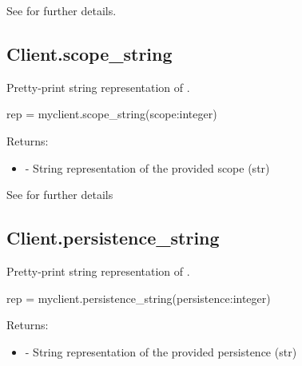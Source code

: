 See  for further details.


\subsection{Client.scope_string}

\summary

Pretty-print string representation of .

\format

\pyspecificstart
\begin{codepar}
rep = myclient.scope_string(scope:integer)
\end{codepar}
\pyspecificend

\begin{arglist}
\end{arglist}

Returns:
\begin{itemize}
    \item {} - String representation of the provided scope (str)
\end{itemize}

See  for further details


\subsection{Client.persistence_string}

\summary

Pretty-print string representation of .

\format

\pyspecificstart
\begin{codepar}
rep = myclient.persistence_string(persistence:integer)
\end{codepar}
\pyspecificend

\begin{arglist}
\end{arglist}

Returns:
\begin{itemize}
    \item {} - String representation of the provided persistence (str)
\end{itemize}

